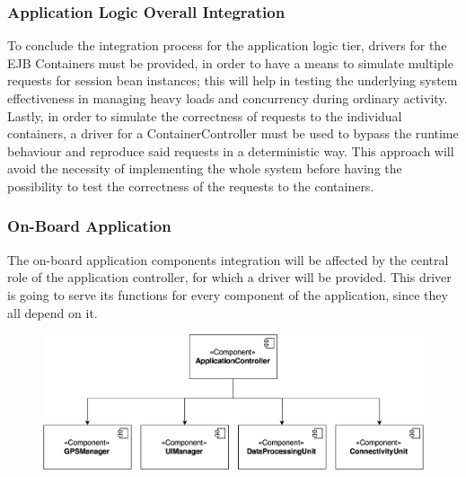 \subsubsection{Application Logic Overall Integration}
To conclude the integration process for the application logic tier, drivers for the EJB Containers must be provided, in order to have a means to simulate multiple requests for session bean instances; this will help in testing the underlying system effectiveness in managing heavy loads and concurrency during ordinary activity.
\noindent
Lastly, in order to simulate the correctness of requests to the individual containers, a driver for a ContainerController must be used to bypass the runtime behaviour and reproduce said requests in a deterministic way. This approach will avoid the necessity of implementing the whole system before having the possibility to test the correctness of the requests to the containers.

\subsubsection{On-Board Application}
The on-board application components integration will be affected by the central role of the application controller, for which a driver will be provided. This driver is going to serve its functions for every component of the application, since they all depend on it.


\begin{figure}[H]
\begin{center}
		\includegraphics[width=\textwidth]{./integration_strategy/diagrams/on_board.png}
\end{center}
\end{figure}

